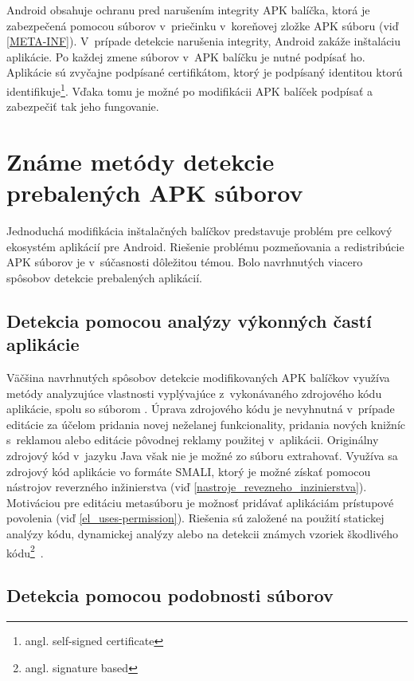 Android obsahuje ochranu pred narušením integrity APK balíčka, ktorá je zabezpečená pomocou súborov v~priečinku  v~koreňovej zložke APK súboru (viď \ref{META-INF}). V~prípade detekcie narušenia integrity, Android zakáže inštaláciu aplikácie. Po každej zmene súborov v~APK balíčku je nutné podpísať ho. Aplikácie sú zvyčajne podpísané certifikátom, ktorý je podpísaný identitou ktorú identifikuje\footnote{angl. self-signed certificate}. Vďaka tomu je možné po modifikácii APK balíček podpísať a zabezpečiť tak jeho fungovanie.

\section{Známe metódy detekcie prebalených APK súborov}

Jednoduchá modifikácia inštalačných balíčkov predstavuje problém pre celkový ekosystém aplikácií pre Android. Riešenie problému pozmeňovania a redistribúcie APK súborov je v~súčasnosti dôležitou témou. Bolo navrhnutých viacero spôsobov detekcie prebalených aplikácií. 

\subsection{Detekcia pomocou analýzy výkonných častí aplikácie}
Väčšina navrhnutých spôsobov detekcie modifikovaných APK balíčkov využíva metódy analyzujúce vlastnosti vyplývajúce z~vykonávaného zdrojového kódu aplikácie, spolu so súborom . Úprava zdrojového kódu je nevyhnutná v~prípade editácie za účelom pridania novej neželanej funkcionality, pridania nových knižníc s~reklamou alebo editácie pôvodnej reklamy použitej v~aplikácii. Originálny zdrojový kód v~jazyku Java však nie je možné zo súboru  extrahovať. Využíva sa zdrojový kód aplikácie vo formáte SMALI, ktorý je možné získať pomocou nástrojov reverzného inžinierstva (viď \ref{nastroje_revezneho_inzinierstva}). Motiváciou pre editáciu metasúboru  je možnosť pridávať aplikáciám prístupové povolenia (viď \ref{el_uses-permission}).
Riešenia sú založené na použití statickej analýzy kódu, dynamickej analýzy alebo na detekcii známych vzoriek škodlivého kódu\footnote{angl. signature based}~\cite{Huang2013,Chen2015,Milanova2005,Levchenko2011,Hanna2013,Zhou2012,Potharaju2012}.
	
\subsection{Detekcia pomocou podobnosti súborov}

